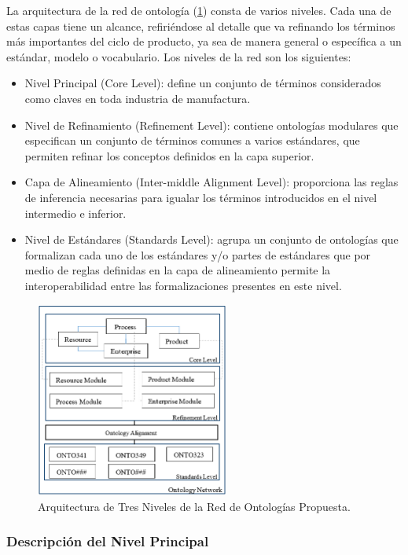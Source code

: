 \documentclass[journal]{IEEEtran}
\begin{document}
La arquitectura de la red de ontolog\'ia (\ref{fig2}) consta de varios niveles. Cada una de estas capas tiene un alcance, refiri\'endose al detalle que va refinando los t\'erminos m\'as importantes del ciclo de producto, ya sea de manera general o espec\'ifica a un est\'andar, modelo o vocabulario. Los niveles de la red son los siguientes:

\begin{itemize}
    \item Nivel Principal (Core Level): define un conjunto de t\'erminos considerados como claves en toda industria de manufactura.
    \item Nivel de Refinamiento (Refinement Level): contiene ontolog\'ias modulares que especifican un conjunto de t\'erminos comunes a varios est\'andares, que permiten refinar los conceptos definidos en la capa superior.
    \item Capa de Alineamiento (Inter-middle Alignment Level): proporciona las reglas de inferencia necesarias para igualar los t\'erminos introducidos en el nivel intermedio e inferior.
    \item Nivel de Est\'andares (Standards Level): agrupa un conjunto de ontolog\'ias que formalizan cada uno de los est\'andares y/o partes de est\'andares que por medio de reglas definidas en la capa de alineamiento permite la interoperabilidad entre las formalizaciones presentes en este nivel.  
\end{itemize}



\begin{figure}[!t]
\centering
\includegraphics[width=2.5in]{figures/figure2.png}
\caption{Arquitectura de Tres Niveles de la Red de Ontolog\'ias Propuesta.}
\label{fig2}
\end{figure}



\subsubsection{Descripci\'on del Nivel Principal}
\end{document}

